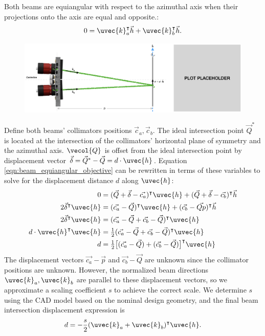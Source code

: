 Both beams are equiangular with respect to the azimuthal axis when their projections onto the axis are equal and opposite.:
\begin{equation}
    0 = \uvec{k}_a^\intercal \vec{h} + \uvec{k}_b^\intercal \vec{h}.
    \label{eqn:beam_equiangular_objective}
\end{equation}

\begin{figure}
    \centering
    \includegraphics[width=\linewidth]{../figures/beam_alignment_geometry.png}
    \caption{}
    \label{fig:beam_alignment_geometry}
\end{figure}
%
Define both beams' collimators positions $\vec{c}_a, \vec{c}_b$. The ideal intersection point $\vec{Q}^*$ is located at the intersection of the collimators' horizontal plane of symmetry and the azimuthal axis. $\vecol{Q}$ is offset from the ideal intersection point by displacement vector $\vec{\delta} = \vec{Q}^* - \vec{Q} = d \cdot \uvec{h}$. Equation \ref{eqn:beam_equiangular_objective} can be rewritten in terms of these variables to solve for the displacement distance $d$ along $\uvec{h}$:
\begin{equation}
    \begin{split}
    0 &= (\vec{Q} + \vec{\delta} - \vec{c_a})^\intercal \uvec{h} + (\vec{Q} + \vec{\delta} - \vec{c_b})^\intercal \vec{h} \\
    2 \vec{\delta}^\intercal \uvec{h} &= (\vec{c_a} - \vec{Q})^\intercal \uvec{h} + (\vec{c_b} - \vec{Qp})^\intercal \vec{h} \\
    2 \vec{\delta}^\intercal \uvec{h} &= (\vec{c_a} - \vec{Q} + \vec{c_b} - \vec{Q})^\intercal \uvec{h} \\
    d \cdot \uvec{h}^\intercal \uvec{h} &= \tfrac{1}{2} (\vec{c_a} - \vec{Q} + \vec{c_b} - \vec{Q})^\intercal \uvec{h} \\
    d &= \tfrac{1}{2} \big[(\vec{c_a} - \vec{Q}) + (\vec{c_b} - \vec{Q})\big]^\intercal \uvec{h}
    \end{split}
\end{equation}
%
The displacement vectors $\vec{c_a} - \vec{p}$ and $\vec{c_b} - \vec{Q}$ are unknown since the collimator positions are unknown. However, the normalized beam directions $\uvec{k}_a, \uvec{k}_b$ are parallel to these displacement vectors, so we approximate a scaling coefficient $s$ to achieve the correct scale. We determine $s$ using the CAD model based on the nominal design geometry, and the final beam intersection displacement expression is
%
\begin{equation}
    d = -\frac{s}{2} (\uvec{k}_a + \uvec{k}_b)^\intercal \uvec{h}.
    \label{eqn:beam_alignment_displacement}
\end{equation}

